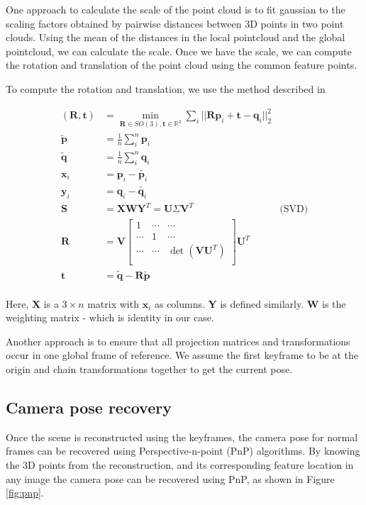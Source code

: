 \documentclass{article}
\begin{document}
One approach to calculate the scale of the point cloud is to fit gaussian to the scaling factors obtained by pairwise distances between 3D points in two point clouds. Using the mean of the distances in the local pointcloud and the global pointcloud, we can calculate the scale. Once we have the scale, we can compute the rotation and translation of the point cloud using the common feature points.

To compute the rotation and translation, we use the method described in \citep{rigid}

\begin{align*}
    (\textbf{R}, \textbf{t}) &= \min_{\textbf{R} \in SO(3), \textbf{t} \in \mathbb{R}^{3}} \sum_i || \textbf{Rp}_i + \textbf{t} - \textbf{q}_i||^{2}_{2}\\
    \tilde{\textbf{p}} &= \frac{1}{n} \sum_i^{n} \textbf{p}_i\\
    \tilde{\textbf{q}} &= \frac{1}{n} \sum_i^{n} \textbf{q}_i\\
    \textbf{x}_i &= \textbf{p}_i - \tilde{\textbf{p}_i}\\
    \textbf{y}_i &= \textbf{q}_i - \tilde{\textbf{q}_i}\\
    \textbf{S} &= \textbf{XWY}^{T} = \textbf{U}\Sigma\textbf{V}^{T} & \text{(SVD)}\\
    \textbf{R} &= \textbf{V} \begin{bmatrix}
        1 & \cdots & \cdots\\
        \cdots & 1 & \cdots\\
        \cdots & \cdots & \det(\textbf{VU}^{T})\\
    \end{bmatrix} \textbf{U}^{T}\\
    \textbf{t} &= \tilde{\textbf{q}} - \textbf{R}\tilde{\textbf{p}}\\
\end{align*}

Here, \textbf{X} is a $3\times n$ matrix with $\textbf{x}_i$ as columns. \textbf{Y} is defined similarly. \textbf{W} is the weighting matrix - which is identity in our case.

Another approach is to ensure that all projection matrices and transformations occur in one global frame of reference. We assume the first keyframe to be at the origin and chain transformations together to get the current pose.

\subsection{Camera pose recovery}
Once the scene is reconstructed using the keyframes, the camera pose for normal frames can be recovered using Perspective-n-point (PnP) algorithms. By knowing the 3D points from the reconstruction, and its corresponding feature location in any image the camera pose can be recovered using PnP, as shown in Figure \ref{fig:pnp}.
\end{document}
